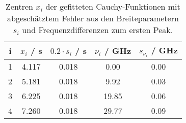 \begin{table}[H]
\caption{Zentren $x_i$ der gefitteten Cauchy-Funktionen mit abgeschätztem Fehler aus den Breiteparametern $s_i$ und Frequenzdifferenzen zum ersten Peak. }
\begin{center}
\begin{tabular}{|c|c|c|c|c|}
  \hline
  i & $x_i$ / s & $0.2 \cdot s_i$ / s & $\nu_i$ / GHz & $s_{\nu_i}$ / GHz \\ \hline
  1 & 4.117 & 0.018 & 0.00 & 0.00 \\ \hline
  2 & 5.181 & 0.018 & 9.92 & 0.03 \\ \hline
  3 & 6.225 & 0.018 & 19.85 & 0.06 \\ \hline
  4 & 7.260 & 0.018 & 29.77 & 0.09 \\ \hline
\end{tabular}
\end{center}
\label{tab:etalon:calib:up}
\end{table}
